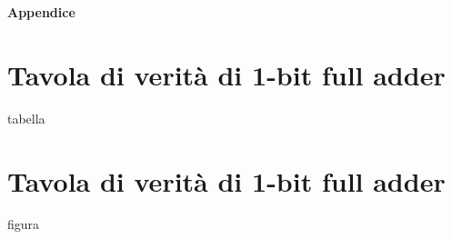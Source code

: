 \appendix
  \textbf{\huge{Appendice}}
  \section{Tavola di verità di 1-bit full adder}\label{sec:1bfa-tavola}
  tabella
  \section{Tavola di verità di 1-bit full adder}\label{sec:1bfa-circuito}
  figura
